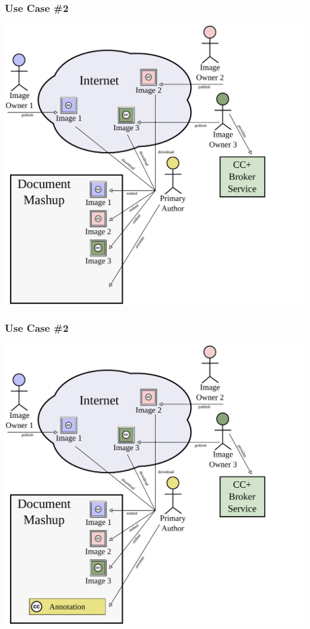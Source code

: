 \documentclass[mathserif,xcolor=dvipsnames,hyperref={bookmarks=true}]{beamer}
\begin{document}
    \begin{frame}[t]
        \frametitle{Use Case \#2}
        \begin{center}
            \includegraphics[width=0.9\textheight]{../resources/usecases/usecase2/usecase2-step24.pdf}
        \end{center}
    \end{frame}
    \begin{frame}[t]
        \frametitle{Use Case \#2}
        \begin{center}
            \includegraphics[width=0.9\textheight]{../resources/usecases/usecase2/usecase2-step25.pdf}
        \end{center}
    \end{frame}
\end{document}
